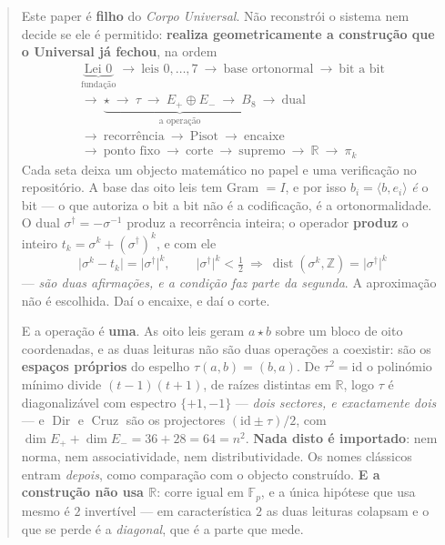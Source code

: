 \documentclass[11pt,a4paper]{article}
\newcommand{\abs}[1]{\lvert #1\rvert}
\newcommand{\dg}{^{\dagger}}
\begin{document}
\begin{abstract}
\smallskip\noindent Este paper é \textbf{filho} do \emph{Corpo Universal}. Não
reconstrói o sistema nem decide se ele é permitido: \textbf{realiza
geometricamente a construção que o Universal já fechou}, na ordem
\[
\boxed{\;\begin{gathered}
\underbrace{\text{Lei 0}}_{\text{fundação}}\ \to\ \text{leis }0,\ldots,7\ \to\
\text{base ortonormal}\ \to\ \text{bit a bit}\\
\to\ \underbrace{\star\ \to\ \tau\ \to\ E_{+}\oplus E_{-}\ \to\ B_8}_{\text{a operação}}
\ \to\ \text{dual}\\
\to\ \text{recorrência}\ \to\ \text{Pisot}\ \to\ \text{encaixe}\\
\to\ \text{ponto fixo}\ \to\ \text{corte}\ \to\ \text{supremo}
\ \to\ \mathbb{R}\ \to\ \pi_k
\end{gathered}\;}
\]
Cada seta deixa um objecto matemático no papel e uma verificação no
repositório. A base das
oito leis tem Gram $=I$, e por isso $b_i=\langle b,e_i\rangle$ \emph{é} o bit
--- o que autoriza o bit a bit não é a codificação, é a ortonormalidade. O dual
$\sigma\dg=-\sigma^{-1}$ produz a recorrência inteira; o operador \textbf{produz}
o inteiro $t_k=\sigma^{k}+(\sigma\dg)^{k}$, e com ele
\[
\abs{\sigma^{k}-t_k}=\abs{\sigma\dg}^{k},
\qquad
\abs{\sigma\dg}^{k}<\tfrac12\ \Longrightarrow\
\operatorname{dist}(\sigma^{k},\mathbb{Z})=\abs{\sigma\dg}^{k}
\]
--- \emph{são duas afirmações, e a condição faz parte da segunda}. A aproximação
não é escolhida. Daí o encaixe, e daí o corte.

\smallskip\noindent
E a operação é \textbf{uma}. As oito leis geram $a\star b$ sobre um bloco de oito
coordenadas, e as duas leituras não são duas operações a coexistir: são os
\textbf{espaços próprios} do espelho $\tau(a,b)=(b,a)$. De $\tau^{2}=\mathrm{id}$ o
polinómio mínimo divide $(t-1)(t+1)$, de raízes distintas em $\mathbb{R}$, logo $\tau$ é
diagonalizável com espectro $\{+1,-1\}$ --- \emph{dois sectores, e exactamente dois} ---
e $\operatorname{Dir}$ e $\operatorname{Cruz}$ são os projectores
$(\mathrm{id}\pm\tau)/2$, com $\dim E_{+}+\dim E_{-}=36+28=64=n^{2}$. \textbf{Nada disto
é importado}: nem norma, nem associatividade, nem distributividade. Os nomes clássicos
entram \emph{depois}, como comparação com o objecto construído. \textbf{E a construção
não usa $\mathbb{R}$}: corre igual em $\mathbb{F}_p$, e a única hipótese que usa mesmo é
$2$ invertível --- em característica $2$ as duas leituras colapsam e o que se perde é a
\emph{diagonal}, que é a parte que mede.


\end{abstract}
\end{document}
